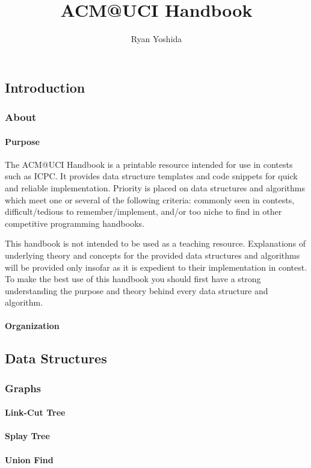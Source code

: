 \documentclass[letterpaper,11pt,twoside]{article}
\title{ACM@UCI Handbook}
\author{Ryan Yoshida}
\newcommand{\PartDivider}[1] {
    \clearpage
    \thispagestyle{empty}
    \vspace*{\stretch{2}}
    \begin{center}
        \part{#1}
    \end{center}
    \vspace*{\stretch{4}}
    \clearpage
}
\begin{document}
    
    
    \setlength{\parindent}{0.5in}
    \singlespace
    \pagestyle{fancy}

    \tableofcontents

    \PartDivider{Introduction}
        \section{About}
            \subsection{Purpose}
            The ACM@UCI Handbook is a printable resource intended for use in contests such as ICPC.
            It provides data structure templates and code snippets for quick and reliable implementation.
            Priority is placed on data structures and algorithms which meet one or several of the following criteria: commonly seen in contests, difficult/tedious to remember/implement, and/or too niche to find in other competitive programming handbooks.

            This handbook is not intended to be used as a teaching resource.
            Explanations of underlying theory and concepts for the provided data structures and algorithms will be provided only insofar as it is expedient to their implementation in contest.
            To make the best use of this handbook you should first have a strong understanding the purpose and theory behind every data structure and algorithm.

            \subsection{Organization}


    \PartDivider{Data Structures}
        \section{Graphs}
            \subsection{Link-Cut Tree}
            \subsection{Splay Tree}
            \subsection{Union Find}
\end{document}
